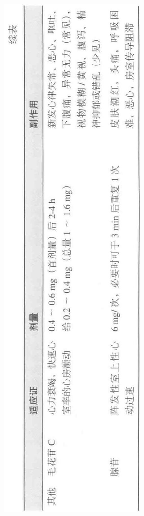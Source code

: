 \documentclass[10pt]{article}
\begin{document}
\begin{center}
\includegraphics[max width=\textwidth]{2024_07_05_645bb794a4d4f32ee0c8g-353}
\end{center}
\end{document}
